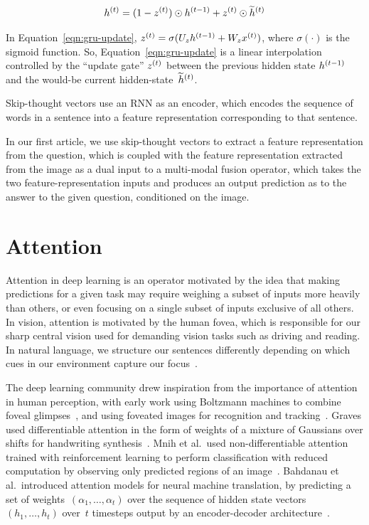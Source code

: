 \begin{equation}
        h^{(t)} = (1 - z^{(t)}) \odot h^{(t - 1)} + z^{(t)} \odot \widetilde{h}^{(t)}
\label{eqn:gru-update}
\end{equation}

In Equation~\ref{eqn:gru-update},
$z^{(t)} = \sigma(U_zh^{(t - 1)} + W_zx^{(t)})$,
where $\sigma(\cdot)$ is the sigmoid function. So,
Equation~\ref{eqn:gru-update} is a linear interpolation controlled by the
``update gate'' $z^{(t)}$ between the previous hidden state
$h^{(t - 1)}$ and the would-be current
hidden-state~$\widetilde{h}^{(t)}$.

Skip-thought vectors use an RNN as an encoder, which encodes the sequence of
words in a sentence into a feature representation corresponding to that
sentence.

In our first article, we use skip-thought vectors to extract a feature
representation from the question, which is coupled with the feature
representation extracted from the image as a dual input to a multi-modal fusion
operator, which takes the two feature-representation inputs and produces an
output prediction as to the answer to the given question, conditioned on the
image.


\section{Attention}

Attention in deep learning is an operator motivated by the idea that making
predictions for a given task may require weighing a subset of inputs more
heavily than others, or even focusing on a single subset of inputs exclusive of
all others.
In vision, attention is motivated by the human fovea, which is responsible for
our sharp central vision used for demanding vision tasks such as driving and
reading.
In natural language, we structure our sentences differently depending on which
cues in our environment capture our focus~\cite{myachykov2005attention}.

The deep learning community drew inspiration from the importance of attention
in human perception, with early work using Boltzmann machines to combine foveal
glimpses~\cite{larochelle2010learning}, and using foveated images for
recognition and tracking~\cite{denil2012learning}.
Graves used differentiable attention in the form of weights of a mixture of
Gaussians over shifts for handwriting synthesis~\cite{graves2013generating}.
Mnih et al.\ used non-differentiable attention trained with reinforcement
learning to perform classification with reduced computation by observing only
predicted regions of an image~\cite{mnih2014recurrent}.
Bahdanau et al.\ introduced attention models for neural machine translation,
by predicting a set of weights~$(\alpha_1, \dots, \alpha_t)$ over the sequence
of hidden state vectors~$(h_1, \dots, h_t)$ over~$t$ timesteps output by an
encoder-decoder architecture~\cite{cho2014ontheproperties}.

